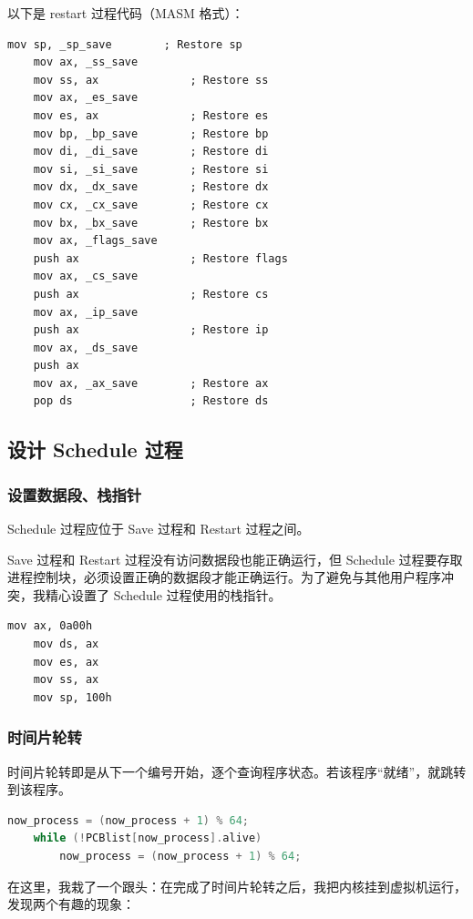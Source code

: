 \documentclass{article}
\begin{document}
以下是 restart 过程代码（MASM 格式）：

\begin{lstlisting}[language={[x86masm]Assembler}]
	mov sp, _sp_save		; Restore sp
	mov ax, _ss_save
	mov ss, ax				; Restore ss
	mov ax, _es_save
	mov es, ax				; Restore es
	mov bp, _bp_save		; Restore bp
	mov di, _di_save		; Restore di
	mov si, _si_save		; Restore si
	mov dx, _dx_save		; Restore dx
	mov cx, _cx_save		; Restore cx
	mov bx, _bx_save		; Restore bx
	mov ax, _flags_save
	push ax					; Restore flags
	mov ax, _cs_save
	push ax					; Restore cs
	mov ax, _ip_save
	push ax					; Restore ip
	mov ax, _ds_save
	push ax
	mov ax, _ax_save		; Restore ax
	pop ds					; Restore ds
\end{lstlisting}

\subsection{设计 Schedule 过程}

\subsubsection{设置数据段、栈指针}

Schedule 过程应位于 Save 过程和 Restart 过程之间。

Save 过程和 Restart 过程没有访问数据段也能正确运行，但 Schedule 过程要存取进程控制块，必须设置正确的数据段才能正确运行。为了避免与其他用户程序冲突，我精心设置了 Schedule 过程使用的栈指针。

\begin{lstlisting}[language={[x86masm]Assembler}]
	mov ax, 0a00h
	mov ds, ax
	mov es, ax
	mov ss, ax
	mov sp, 100h
\end{lstlisting}

\subsubsection{时间片轮转}

时间片轮转即是从下一个编号开始，逐个查询程序状态。若该程序“就绪”，就跳转到该程序。

\begin{lstlisting}[language=C]
	now_process = (now_process + 1) % 64;
	while (!PCBlist[now_process].alive)
		now_process = (now_process + 1) % 64;
\end{lstlisting}

在这里，我栽了一个跟头：在完成了时间片轮转之后，我把内核挂到虚拟机运行，发现两个有趣的现象：
\end{document}
